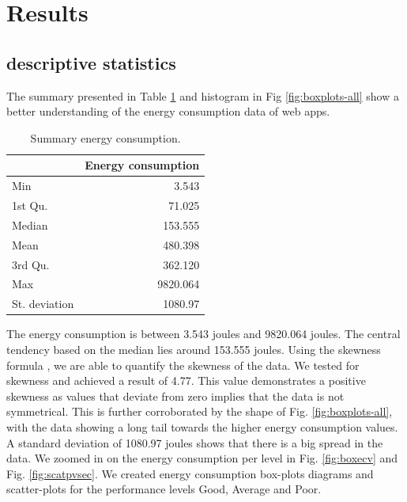 \section{Results} 
\subsection{descriptive statistics}
The summary presented in Table \ref{tab:table3} and histogram in Fig \ref{fig:boxplots-all} show a better understanding of the energy consumption data of web apps. 

\begin{table}[h!]
  \begin{center}
    \begin{tabular}{l|r} %
      \textbf{  } & \textbf{Energy consumption} \\
      \hline
      Min & 3.543\\
      1st Qu. & 71.025\\
      Median & 153.555\\
      Mean & 480.398 \\
      3rd Qu. & 362.120 \\
      Max & 9820.064 \\
      St. deviation & 1080.97\\
    \end{tabular}
        \caption{Summary energy consumption.}
           \label{tab:table3}
  \end{center}
\end{table}



The energy consumption is between 3.543 joules and 9820.064 joules. The central tendency based on the median lies around 153.555 joules. Using the skewness formula \cite{Rep:e1071}, we are able to quantify the skewness of the data. We tested for skewness and achieved a result of 4.77. This value demonstrates a positive skewness as values that deviate from zero implies that the data is not symmetrical. This is further corroborated by the shape of Fig. \ref{fig:boxplots-all}, with the data showing a long tail towards the higher energy consumption values. A standard deviation of 1080.97 joules shows that there is a big spread in the data. We zoomed in on the energy consumption per level in Fig. \ref{fig:boxecv} and Fig. \ref{fig:scatpvsec}. We created energy consumption box-plots diagrams and scatter-plots for the performance levels Good, Average and Poor.


